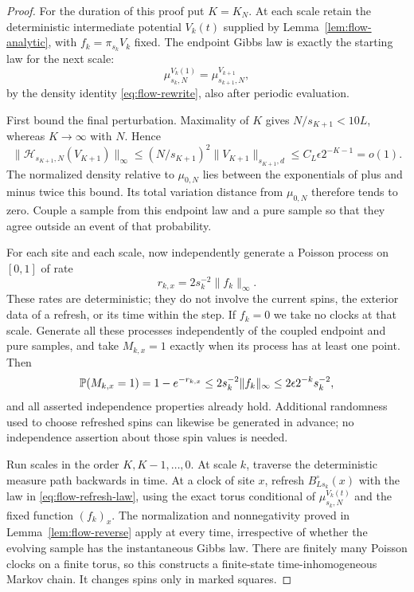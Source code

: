 \begin{proof}
For the duration of this proof put \(K=K_N\).  At each scale retain the
deterministic intermediate potential \(V_k(t)\) supplied by
Lemma~\ref{lem:flow-analytic}, with \(f_k=\pi_{s_k}V_k\) fixed.
The endpoint Gibbs law is exactly the starting law for the next scale:
\[
 \mu_{s_k,N}^{V_k(1)}=\mu_{s_{k+1},N}^{V_{k+1}},
\]
by the density identity \eqref{eq:flow-rewrite}, also after periodic
evaluation.

First bound the final perturbation.  Maximality of \(K\) gives
\(N/s_{K+1}<10L\), whereas \(K\to\infty\) with \(N\).  Hence
\begin{equation}\label{eq:flow-terminal-density}
 \|\mathcal H_{s_{K+1},N}(V_{K+1})\|_\infty
 \le (N/s_{K+1})^2\|V_{K+1}\|_{s_{K+1},d}
 \le C_L\epsilon2^{-K-1}=o(1).
\end{equation}
The normalized density relative to \(\mu_{0,N}\) lies between the
exponentials of plus and minus twice this bound.  Its total variation
distance from \(\mu_{0,N}\) therefore tends to zero.  Couple a sample
from this endpoint law and a pure sample so that they agree outside an
event of that probability.

For each site and each scale, now independently generate a Poisson process
on \([0,1]\) of rate
\[
 r_{k,x}=2s_k^{-2}\|f_k\|_\infty.
\]
These rates are deterministic; they do not involve the current spins,
the exterior data of a refresh, or its time within the step.  If \(f_k=0\)
we take no clocks at that scale.  Generate all these processes independently
of the coupled endpoint and pure samples, and take \(M_{k,x}=1\) exactly
when its process has at least one point.  Then
\[
 \P(M_{k,x}=1)=1-e^{-r_{k,x}}
 \le2s_k^{-2}\|f_k\|_\infty
 \le2\epsilon2^{-k}s_k^{-2},
\]
and all asserted independence properties already hold.  Additional
randomness used to choose refreshed spins can likewise be generated in
advance; no independence assertion about those spin values is needed.

Run scales in the order \(K,K-1,\ldots,0\).  At scale \(k\), traverse
the deterministic measure path backwards in time.  At a clock of site
\(x\), refresh \(B_{Ls_k}^\circ(x)\) with the law in
\eqref{eq:flow-refresh-law}, using the exact torus conditional of
\(\mu_{s_k,N}^{V_k(t)}\) and the fixed function \((f_k)_x\).  The
normalization and nonnegativity proved in Lemma~\ref{lem:flow-reverse}
apply at every time, irrespective of whether the evolving sample has the
instantaneous Gibbs law.  There are finitely many Poisson clocks on a
finite torus, so this constructs a finite-state time-inhomogeneous Markov
chain.  It changes spins only in marked squares.


\end{proof}
